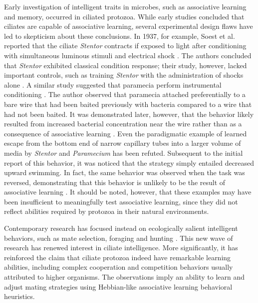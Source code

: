 Early investigation of intelligent traits in microbes, such as associative learning and memory, occurred in ciliated protozoa. While early studies concluded that ciliates are capable of associative learning, several experimental design flaws have led to skepticism about these conclusions. In 1937, for example, Soest et al. reported that the ciliate \textit{Stentor} contracts if exposed to light after conditioning with simultaneous luminous stimuli and electrical shock \cite{soest_dressuryersuche_1937}. The authors concluded that \textit{Stentor} exhibited classical condition response; their study, however, lacked important controls, such as training \textit{Stentor} with the administration of shocks alone \cite{corning_protozoa_1973}. A similar study suggested that paramecia perform instrumental conditioning \cite{gelber_investigations_1952}. The author observed that paramecia attached preferentially to a bare wire that had been baited previously with bacteria compared to a wire that had not been baited. It was demonstrated later, however, that the behavior likely resulted from increased bacterial concentration near the wire rather than as a consequence of associative learning \cite{jensen_experiments_1957}. Even the paradigmatic example of learned escape from the bottom end of narrow capillary tubes into a larger volume of media by \textit{Stentor} and \textit{Paramecium} has been refuted. Subsequent to the initial report of this behavior, it was noticed that the strategy simply entailed decreased upward swimming. In fact, the same behavior was observed when the task was reversed, demonstrating that this behavior is unlikely to be the result of associative learning \cite{hinkle_is_1994}. It should be noted, however, that these examples may have been insufficient to meaningfully test associative learning, since they did not reflect abilities required by protozoa in their natural environments.

Contemporary research has focused instead on ecologically salient intelligent behaviors, such as mate selection, foraging and hunting \cite{clark_classical_2010, clark_arrhenius-kinetics_2010, clark_social_2012, clark_ciliates_2013}. This new wave of research has renewed interest in ciliate intelligence. More significantly, it has reinforced the claim that ciliate protozoa indeed have remarkable learning abilities, including complex cooperation and competition behaviors usually attributed to higher organisms. The observations imply an ability to learn and adjust mating strategies using Hebbian-like associative learning behavioral heuristics.

